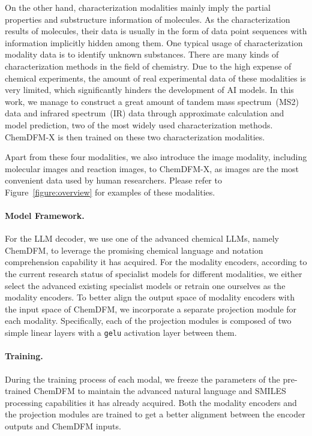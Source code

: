 On the other hand, characterization modalities mainly imply the partial properties and substructure information of molecules. As the characterization results of molecules, their data is usually in the form of data point sequences with information implicitly hidden among them. One typical usage of characterization modality data is to identify unknown substances. There are many kinds of characterization methods in the field of chemistry. Due to the high expense of chemical experiments, the amount of real experimental data of these modalities is very limited, which significantly hinders the development of AI models. In this work, we manage to construct a great amount of tandem mass spectrum~(MS2) data and infrared spectrum~(IR) data through approximate calculation and model prediction, two of the most widely used characterization methods. ChemDFM-X is then trained on these two characterization modalities.

Apart from these four modalities, we also introduce the image modality, including molecular images and reaction images, to ChemDFM-X, as images are the most convenient data used by human researchers. Please refer to Figure~\ref{figure:overview} for examples of these modalities.

\paragraph{Model Framework.} For the LLM decoder, we use one of the advanced chemical LLMs, namely ChemDFM, to leverage the promising chemical language and notation comprehension capability it has acquired. For the modality encoders, according to the current research status of specialist models for different modalities, we either select the advanced existing specialist models or retrain one ourselves as the modality encoders. To better align the output space of modality encoders with the input space of ChemDFM, we incorporate a separate projection module for each modality. Specifically, each of the projection modules is composed of two simple linear layers with a \texttt{gelu} activation layer between them.

\paragraph{Training.} During the training process of each modal, we freeze the parameters of the pre-trained ChemDFM to maintain the advanced natural language and SMILES processing capabilities it has already acquired. Both the modality encoders and the projection modules are trained to get a better alignment between the encoder outputs and ChemDFM inputs.

